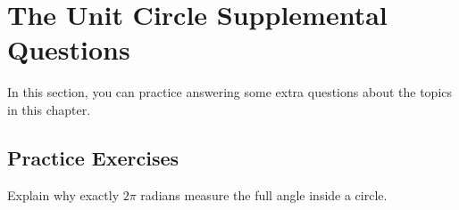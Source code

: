 
\section{The Unit Circle Supplemental Questions} \label{supplement-unit-circle}
In this section, you can practice answering some extra questions about the topics in this chapter.

\subsection*{Practice Exercises} \label{practice-exercises-supplement}

\begin{myPractice}
	Explain why exactly $2\pi$ radians measure the full angle inside a circle.
	\vfill
\end{myPractice}

